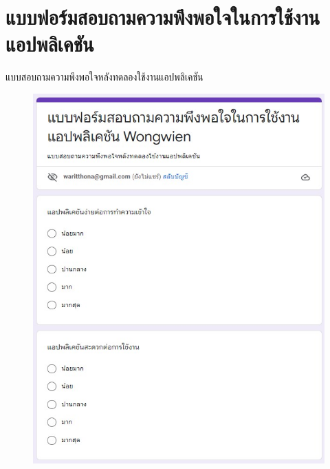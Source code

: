 \chapter{แบบฟอร์มสอบถามความพึงพอใจในการใช้งานแอปพลิเคชัน}



แบบสอบถามความพึงพอใจหลังทดลองใช้งานแอปพลิเคชัน

\begin{figure}
  \begin{center}
    \includegraphics[width=1\textwidth]{./image/form/form1.jpg}
  \end{center}
  \end{figure}

